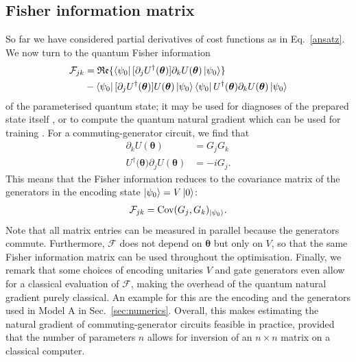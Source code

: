 \documentclass[a4paper,twocolumn,11pt,accepted=2025-09-06]{quantumarticle}
\renewcommand{\vec}{\boldsymbol}
\begin{document}
\subsection{Fisher information matrix}
So far we have considered partial derivatives of cost functions as in Eq.~\eqref{ansatz}.
We now turn to the quantum Fisher information 
%
\begin{align}
    \mathcal{F}_{jk} &= \mathfrak{Re}\{
    \bra{\psi_0}[\partial_j U^\dagger(\vec\theta)] \partial_k U(\vec\theta) \ket{\psi_0}
    \} \\
    &- \bra{\psi_0}[\partial_jU^\dagger(\vec{\theta})] U(\vec{\theta})\ket{\psi_0}
    \bra{\psi_0}U^\dagger(\vec{\theta}) \partial_k U(\vec{\theta})\ket{\psi_0}\nonumber
\end{align}
%
of the parameterised quantum state;
it may be used for diagnoses of the prepared state itself \cite{Meyer2021fisherinformation,Toth_2014,fisher_info_universality}, or to compute the quantum natural gradient which can be used for training \cite{Stokes2020quantumnatural}.
For a commuting-generator circuit, we find that
%
\begin{align}
    [\partial_j U^\dagger(\vec{\theta)}]\partial_k U(\vec\theta) &= G_jG_k\\
    U^\dagger(\vec{\theta)} \partial_j U(\vec\theta) &= -i G_j.
\end{align}
%
This means that the Fisher information reduces to the covariance matrix of the generators in the encoding state $\ket{\psi_0}=V\ket{0}$:
%
\begin{align}
    \mathcal{F}_{jk} = \text{Cov}(G_j, G_k)_{\ket{\psi_0}}.
\end{align}
%
Note that all matrix entries can be measured in parallel because the generators commute. Furthermore, $\mathcal{F}$ does not depend on $\vec{\theta}$ but only on $V$, so that the same Fisher information matrix can be used throughout the optimisation.
Finally, we remark that some choices of encoding unitaries $V$ and gate generators even allow for a classical evaluation of $\mathcal{F}$, making the overhead of the quantum natural gradient purely classical. An example for this are the encoding and the generators used in Model A in Sec.\ \ref{sec:numerics}.
Overall, this makes estimating the natural gradient of commuting-generator circuits feasible in practice, provided that the number of parameters $n$ allows for inversion of an $n \times n$ matrix on a classical computer.
\end{document}
